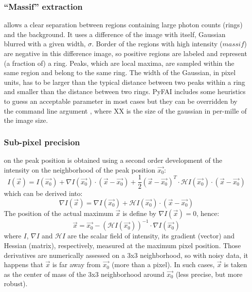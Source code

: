 \documentclass[preprint]{iucr}
\begin{document}
\subsubsection{``Massif'' extraction}
\label{massif}
allows a clear separation between regions containing large
photon counts (rings) and the background.
It uses a difference of the image with itself, Gaussian blurred with a given
width, $\sigma$. 
Border of the regions with high intensity ($massif$) are negative in this
difference image, so positive regions are labeled and represent
(a fraction of) a ring. Peaks, which are local maxima,
are sampled within the same region and belong to the same ring.
The width of the Gaussian, in pixel units, has to be larger than the typical
distance between two peaks within a ring and smaller than the distance between two
rings. 
PyFAI includes some heuristics to guess an acceptable parameter in most cases
but they can be overridden by the command line argument ,
where XX is the size of the gaussian in per-mille of the image size.

\subsubsection{Sub-pixel precision} 
\label{subpixel}
on the peak position is obtained using a second order development of the
intensity on the neighborhood of the peak position $\overrightarrow{x_0}$:
$$ I(\overrightarrow{x}) = I(\overrightarrow{x_0}) + \nabla
I(\overrightarrow{x_0})\cdot (\overrightarrow{x}-\overrightarrow{x_0}) +
\frac{1}{2} (\overrightarrow{x}-\overrightarrow{x_0})^T\cdot\mathcal{H}
I(\overrightarrow{x_0})\cdot(\overrightarrow{x}-\overrightarrow{x_0})$$ which
can be derived into:
$$\nabla I(\overrightarrow{x}) =\nabla I(\overrightarrow{x_0}) +
\mathcal{H}I(\overrightarrow{x_0})\cdot(\overrightarrow{x}-\overrightarrow{x_0})$$
The position of the actual maximum $\overrightarrow{x}$ is define by
$\nabla I(\overrightarrow{x})=0$, hence:
$$\overrightarrow{x} = \overrightarrow{x_0} - (\mathcal{H}
I(\overrightarrow{x_0}))^{-1}\cdot\nabla I(\overrightarrow{x_0})$$ where $I$,
$\nabla I$ and $\mathcal{H} I$ are the scalar field of intensity, its gradient
(vector) and Hessian (matrix), respectively, measured at the maximum pixel position.
Those derivatives are numerically assessed on a 3x3 neighborhood, so with noisy
data, it happens that $\overrightarrow{x}$ is far away from 
$\overrightarrow{x_0}$ (more than a pixel). In such cases, $\overrightarrow{x}$
is taken as the center of mass of the 3x3 neighborhood around
$\overrightarrow{x_0}$ (less precise, but more robust).
\end{document}
